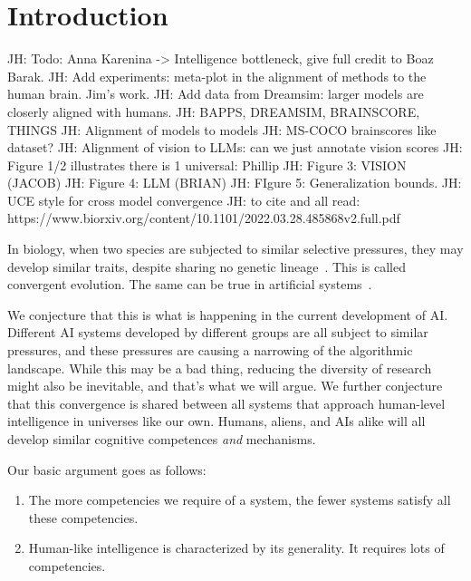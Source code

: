 \documentclass{article}
\newcommand{\jh}[1]{{\;\color{red}JH: #1}}
\theoremstyle{plain}
\theoremstyle{definition}
\theoremstyle{remark}
\begin{document}
\printAffiliationsAndNotice{\icmlEqualContribution} %



\section{Introduction}

\jh{Todo: Anna Karenina -> Intelligence bottleneck, give full credit to Boaz Barak.}
\jh{Add experiments: meta-plot in the alignment of methods to the human brain. Jim's work.}
\jh{Add data from Dreamsim: larger models are closerly aligned with humans.}
\jh{BAPPS, DREAMSIM, BRAINSCORE, THINGS}
\jh{Alignment of models to models}
\jh{MS-COCO brainscores like dataset?}
\jh{Alignment of vision to LLMs: can we just annotate vision scores}
\jh{Figure 1/2 illustrates there is 1 universal: Phillip}
\jh{Figure 3: VISION (JACOB)}
\jh{Figure 4: LLM (BRIAN)}
\jh{FIgure 5: Generalization bounds.}
\jh{UCE style for cross model convergence}
\jh{to cite  and all read: https://www.biorxiv.org/content/10.1101/2022.03.28.485868v2.full.pdf}

In biology, when two species are subjected to similar selective pressures, they may develop similar traits, despite sharing no genetic lineage~\cite{XX}. This is called convergent evolution. The same can be true in artificial systems~\cite{XX}.

We conjecture that this is what is happening in the current development of AI. Different AI systems developed by different groups are all subject to similar pressures, and these pressures are causing a narrowing of the algorithmic landscape. While this may be a bad thing, reducing the diversity of research might also be inevitable, and that's what we will argue. We further conjecture that this convergence is shared between all systems that approach human-level intelligence in universes like our own. Humans, aliens, and AIs alike will all develop similar cognitive competences \textit{and} mechanisms.

Our basic argument goes as follows: 
\begin{enumerate}
\item The more competencies we require of a system, the fewer systems satisfy all these competencies.
\item Human-like intelligence is characterized by its generality. It requires lots of competencies.
\end{enumerate}
\end{document}
